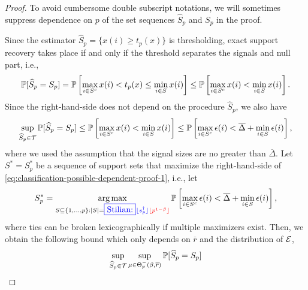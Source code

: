 \begin{proof} %
To avoid cumbersome double subscript notations, we will sometimes suppress dependence on $p$ of the set sequences $\widehat{S}_p$ and $S_p$ in the proof.

Since the estimator $\widehat{S}_p = \{x(i) \ge t_p(x)\}$ is thresholding, exact support recovery takes place if and only if the threshold separates the signals and null part, i.e.,
\begin{equation*}
    \P[\widehat{S}_p = S_p] 
    = \P\left[\max_{i\in S^c}x(i) < t_p(x) \le \min_{i\in S}x(i)\right]
    \le \P\left[\max_{i\in S^c}x(i) < \min_{i\in S}x(i)\right].
\end{equation*}
Since the right-hand-side does not depend on the procedure $\widehat{S}_p$, we also have
\begin{equation} \label{eq:classification-possible-dependent-proof-1}
    \sup_{\widehat{S}_p\in{\cal T}} \P[\widehat{S}_p = S_p] 
    \le \P\left[\max_{i\in S^c}x(i) < \min_{i\in S}x(i)\right]
    \le \P\left[{\max_{i\in S^c}\epsilon(i)} < {\overline{\Delta} + \min_{i\in S}\epsilon(i)}\right],
\end{equation}
where we used the assumption that the signal sizes are no greater than $\overline{\Delta}$.
Let $S^* = S_p^*$ be a sequence of support sets that maximize the right-hand-side of \eqref{eq:classification-possible-dependent-proof-1}, i.e., let
$$
S_p^* = \argmax_{S\subseteq\{1,\ldots,p\}:|S| =\stilian{\lfloor s_p^\dagger \rfloor }{\lfloor p^{1-\beta}\rfloor}} \P\left[{\max_{i\in S^c}\epsilon(i)} < {\overline{\Delta} + \min_{i\in S}\epsilon(i)}\right],
$$
where ties can be broken lexicographically if multiple maximizers exist.
Then,
we obtain the following bound which only depends on $\overline{r}$ and the distribution of ${\cal E}$,
\begin{align}
    \sup_{\widehat{S}_p\in{\cal T}} \sup_{\mu\in\Theta^-_p(\beta,\overline{r})} \P[\widehat{S}_p = S_p] 

\end{align}
\end{proof}
